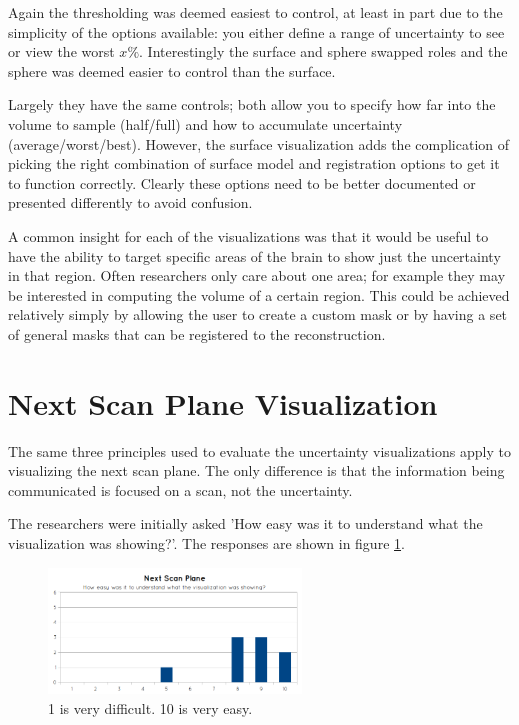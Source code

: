 Again the thresholding was deemed easiest to control, at least in part due to the simplicity of the options available: you either define a range of uncertainty to see or view the worst $x\%$. Interestingly the surface and sphere swapped roles and the sphere was deemed easier to control than the surface.

Largely they have the same controls; both allow you to specify how far into the volume to sample (half/full) and how to accumulate uncertainty (average/worst/best). However, the surface visualization adds the complication of picking the right combination of surface model and registration options to get it to function correctly. Clearly these options need to be better documented or presented differently to avoid confusion.

A common insight for each of the visualizations was that it would be useful to have the ability to target specific areas of the brain to show just the uncertainty in that region. Often researchers only care about one area; for example they may be interested in computing the volume of a certain region. This could be achieved relatively simply by allowing the user to create a custom mask or by having a set of general masks that can be registered to the reconstruction.


\newpage
\section{Next Scan Plane Visualization}\label{results:next_scan_plane}
The same three principles used to evaluate the uncertainty visualizations apply to visualizing the next scan plane. The only difference is that the information being communicated is focused on a scan, not the uncertainty.

The researchers were initially asked 'How easy was it to understand what the visualization was showing?'. The responses are shown in figure \ref{fig:eval_next_scan_plane_q1}.

\begin{figure}[h]
    \centering
  \includegraphics[width=0.6\textwidth]{images/evaluation/graph_next_scan_plane_1.png}
    \caption{1 is very difficult. 10 is very easy.}\label{fig:eval_next_scan_plane_q1}
\end{figure}

